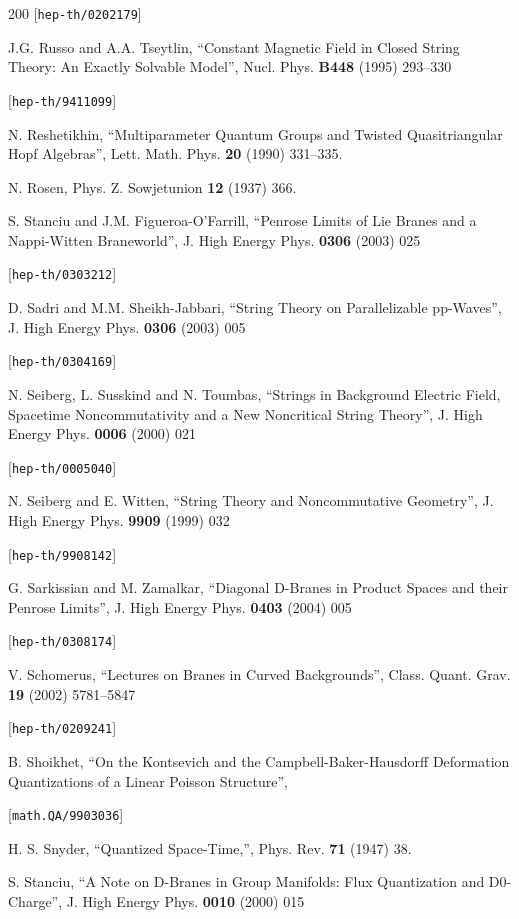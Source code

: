\begin{thebibliography}{200}
 [{\tt hep-th/0202179}] 

 J.G. Russo and A.A. Tseytlin, ``Constant Magnetic Field in Closed String Theory: An Exactly Solvable Model'', Nucl. Phys. {\bf B448} (1995) 293--330 

 [{\tt hep-th/9411099}] 

 N. Reshetikhin, ``Multiparameter Quantum Groups and Twisted Quasitriangular Hopf Algebras'', Lett. Math. Phys. {\bf 20} (1990) 331--335. 

 N. Rosen, Phys. Z. Sowjetunion {\bf 12} (1937) 366. 

 S. Stanciu and J.M. Figueroa-O'Farrill, ``Penrose Limits of Lie Branes and a Nappi-Witten Braneworld'', J. High Energy Phys. {\bf 0306} (2003) 025 

 [{\tt hep-th/0303212}] 

 D. Sadri and M.M. Sheikh-Jabbari, ``String Theory on Parallelizable pp-Waves'', J. High Energy Phys. {\bf 0306} (2003) 005 

 [{\tt hep-th/0304169}] 

 N. Seiberg, L. Susskind and N. Toumbas, ``Strings in Background Electric Field, Spacetime Noncommutativity and a New Noncritical String Theory'', J. High Energy Phys. {\bf 0006} (2000) 021 

 [{\tt hep-th/0005040}] 

 N. Seiberg and E. Witten, ``String Theory and Noncommutative Geometry'', J. High Energy Phys. {\bf 9909} (1999) 032 

 [{\tt hep-th/9908142}] 

 G. Sarkissian and M. Zamalkar, ``Diagonal D-Branes in Product Spaces and their Penrose Limits'', J. High Energy Phys. {\bf 0403} (2004) 005 

 [{\tt hep-th/0308174}] 

 V. Schomerus, ``Lectures on Branes in Curved Backgrounds'', Class. Quant. Grav. {\bf 19} (2002) 5781--5847 

 [{\tt hep-th/0209241}] 

 B. Shoikhet, ``On the Kontsevich and the Campbell-Baker-Hausdorff Deformation Quantizations of a Linear Poisson Structure'', 

 [{\tt math.QA/9903036}] 

 H. S. Snyder, ``Quantized Space-Time,'', Phys. Rev. {\bf 71} (1947) 38. 

 S. Stanciu, ``A Note on D-Branes in Group Manifolds: Flux Quantization and D0-Charge'', J. High Energy Phys. {\bf 0010} (2000) 015 


\end{thebibliography}
